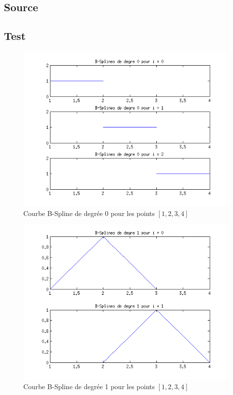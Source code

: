 \documentclass[a4paper,10pt]{report}
\begin{document}
\subsection*{Source}

\begin{center}
	
\end{center}

\subsection*{Test}

\begin{figure}[h]
	\begin{center}
		\includegraphics[scale=0.6]{bik}
		\caption{Courbe B-Spline de degrée 0 pour les points $[1, 2, 3, 4]$}
	\end{center}
\end{figure}

\begin{figure}[h]
	\begin{center}
		\includegraphics[scale=0.6]{bik2}
		\caption{Courbe B-Spline de degrée 1 pour les points $[1, 2, 3, 4]$}
	\end{center}
\end{figure}
\end{document}
